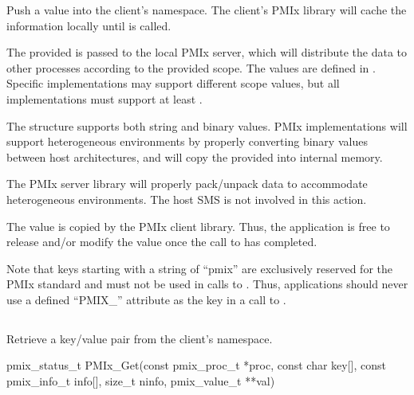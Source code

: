 Push a value into the client's namespace.
The client's \ac{PMIx} library will cache the information locally until  is called.

The provided  is passed to the local PMIx server, which will distribute the data to other processes according to the provided scope.
The  values are defined in .
Specific implementations may support different scope values, but all implementations must support at least .

The  structure supports both string and binary values.
PMIx implementations will support heterogeneous environments by properly converting binary values between host architectures, and will copy the provided  into internal memory.

\adviceimplstart
The PMIx server library will properly pack/unpack data to accommodate heterogeneous environments. The host \ac{SMS} is not involved in this action.
\adviceimplend

\adviceuserstart
The value is copied by the PMIx client library. Thus, the application is free to release and/or modify the value once the call to  has completed.

Note that keys starting with a string of ``pmix'' are exclusively reserved for the \ac{PMIx} standard and must not be used in calls to . Thus, applications should never use a defined ``PMIX_'' attribute as the key in a call to .
\adviceuserend


\subsection{}

\summary

Retrieve a key/value pair from the client's namespace.

\format

\cspecificstart
\begin{codepar}
pmix_status_t
PMIx_Get(const pmix_proc_t *proc, const char key[],
         const pmix_info_t info[], size_t ninfo,
         pmix_value_t **val)
\end{codepar}
\cspecificend

\begin{arglist}
\end{arglist}

